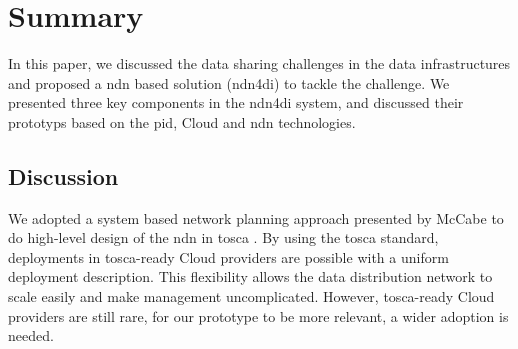 \documentclass[conference]{IEEEtran}
\begin{document}
\section{Summary}
In this paper, we discussed the data sharing challenges in the data infrastructures and proposed a \gls{ndn} based solution (\gls{ndn4di}) to tackle the challenge. We presented three key components in the \gls{ndn4di} system, and discussed their prototyps based on the \gls{pid}, Cloud and \gls{ndn} technologies. 

\subsection{Discussion}

We adopted a system based network planning approach presented by McCabe to do  high-level design of the \gls{ndn} in \gls{tosca} \cite{mccabe2010network}. By using the \gls{tosca} standard, deployments in \gls{tosca}-ready Cloud providers are possible with a uniform deployment description. This flexibility allows the data distribution network to scale easily and make management uncomplicated. However, \gls{tosca}-ready Cloud providers are still rare, for our prototype to be more relevant, a wider adoption is needed.

\end{document}
